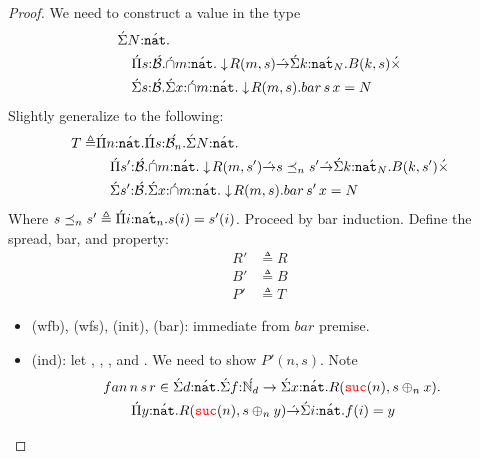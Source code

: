 \begin{proof}
  We need to construct a value in the type 
  \begin{align*}
    &{\acute{\Sigma}} N {:} {\acute{\mathtt{nat}}}.\\
    &\quad{\acute{\Pi}} s {:} {\acute{\mathcal{B}}}.{\acute{\cap}} m {:} {\acute{\mathtt{nat}}}. \downarrow \! R(m,s) 
{\acute{\to}} {\acute{\Sigma}} k {:} {\acute{\mathtt{nat}_N}}.B(k,s)
{\acute{\times}}\\ &\quad{\acute{\Sigma}} s {:} {\acute{\mathcal{B}}}.{\acute{\Sigma}} x {:} {\acute{\cap}} m {:} {\acute{\mathtt{nat}}}. \downarrow \! R(m,s).bar\,s\,x = N
  \end{align*}
  Slightly generalize to the following:
   \begin{align*}
     T \triangleq &{\acute{\Pi}} n {:} {\acute{\mathtt{nat}}}.{\acute{\Pi}} s {:} {\acute{\mathcal{B}_{n}}}.{\acute{\Sigma}} N {:} {\acute{\mathtt{nat}}}.\\
    &\quad{\acute{\Pi}} s' {:} {\acute{\mathcal{B}}}.{\acute{\cap}} m {:} {\acute{\mathtt{nat}}}. \downarrow \! R(m,s') 
{\acute{\to}} s \preceq_n s' {\acute{\to}} {\acute{\Sigma}} k {:} {\acute{\mathtt{nat}_N}}.B(k,s')
{\acute{\times}}\\ &\quad{\acute{\Sigma}} s' {:} {\acute{\mathcal{B}}}.{\acute{\Sigma}} x {:} {\acute{\cap}} m {:} {\acute{\mathtt{nat}}}. \downarrow \! R(m,s).bar\,s'\,x = N
  \end{align*}
  Where $s \preceq_n s' \triangleq {\acute{\Pi}} i {:} {\acute{\mathtt{nat}_n}}.s(i) = s'(i)$.
Proceed by bar induction. Define the spread, bar, and property: 
\begin{align*}
  R' &\triangleq R\\
  B' &\triangleq B\\
  P' &\triangleq T
\end{align*}
\begin{itemize}
  \item (wfb), (wfs), (init), (bar): immediate from $bar$ premise.
  \item (ind): let , , , and 
    . We 
    need to show $P'(n,s)$. Note 
    \begin{align*}
      &\isComp{fan\,n\,s\,r}{\sigmatyc{\isOf{d}{\lift{\nat}}}{
        \sigmatyc{\isOf{f}{\lift{\N_d} \to 
        \sigmatyc{\isOf{x}{\lift{\nat}}}{R(\suc{n},s \oplus_n x)}}}{\\
      &\quad\quad\pityc{\isOf{y}{\lift{\nat}}}{
        R(\suc{n}, s\oplus_n y) \tolr \sigmatyc{\isOf{i}{\lift{\nat}}}{f(i) = y}
      }
    }
  }}
\end{align*}

\end{itemize}
\end{proof}
